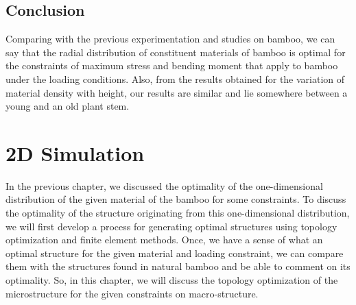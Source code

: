 \documentclass[openright,twoside]{iitkthesis}
\begin{document}
\section{Conclusion}
Comparing with the previous experimentation and studies on bamboo, we can say that the radial distribution of constituent materials of bamboo is optimal for the constraints of maximum stress and bending moment that apply to bamboo under the loading conditions. Also, from the results obtained for the variation of material density with height, our results are similar and lie somewhere between a young and an old plant stem. 

\chapter{2D Simulation}
In the previous chapter, we discussed the optimality of the one-dimensional distribution of the given material of the bamboo for some constraints. To discuss the optimality of the structure originating from this one-dimensional distribution, we will first develop a process for generating optimal structures using topology optimization and finite element methods. Once, we have a sense of what an optimal structure for the given material and loading constraint, we can compare them with the structures found in natural bamboo and be able to comment on its optimality. So, in this chapter, we will discuss the topology optimization of the microstructure for the given constraints on macro-structure.
\\
\end{document}
